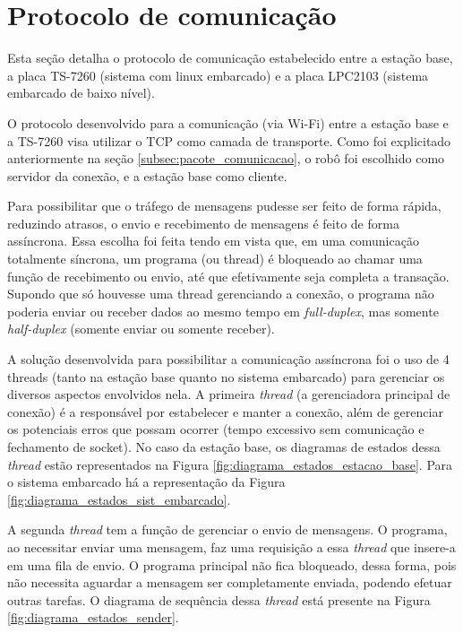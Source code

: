 \section{Protocolo de comunicação}

Esta seção detalha o protocolo de comunicação estabelecido entre a estação base, a placa TS-7260 (sistema com linux embarcado) e a placa LPC2103 (sistema embarcado de baixo nível).

O protocolo desenvolvido para a comunicação (via Wi-Fi) entre a estação base e a TS-7260 visa utilizar o TCP como camada de transporte. Como foi explicitado anteriormente na seção \ref{subsec:pacote_comunicacao}, o robô foi escolhido como servidor da conexão, e a estação base como cliente.

Para possibilitar que o tráfego de mensagens pudesse ser feito de forma rápida, reduzindo atrasos, o envio e recebimento de mensagens é feito de forma assíncrona.
Essa escolha foi feita tendo em vista que, em uma comunicação totalmente síncrona, um programa (ou thread) é bloqueado ao chamar uma função de recebimento ou envio, até que efetivamente seja completa a transação. Supondo que só houvesse uma thread gerenciando a conexão, o programa não poderia enviar ou receber dados ao mesmo tempo em \textit{full-duplex}, mas somente \textit{half-duplex} (somente enviar ou somente receber).

A solução desenvolvida para possibilitar a comunicação assíncrona foi o uso de 4 threads (tanto na estação base quanto no sistema embarcado) para gerenciar os diversos aspectos envolvidos nela. A primeira \textit{thread} (a gerenciadora principal de conexão) é a responsável por estabelecer e manter a conexão, além de gerenciar os potenciais erros que possam ocorrer (tempo excessivo sem comunicação e fechamento de socket). No caso da estação base, os diagramas de estados dessa \textit{thread} estão representados na Figura \ref{fig:diagrama_estados_estacao_base}. Para o sistema embarcado há a representação da Figura \ref{fig:diagrama_estados_sist_embarcado}.

A segunda \textit{thread} tem a função de gerenciar o envio de mensagens. O programa, ao necessitar enviar uma mensagem, faz uma requisição a essa \textit{thread} que insere-a em uma fila de envio. O programa principal não fica bloqueado, dessa forma, pois não necessita aguardar a mensagem ser completamente enviada, podendo efetuar outras tarefas. O diagrama de sequência dessa \textit{thread} está presente na Figura \ref{fig:diagrama_estados_sender}.

